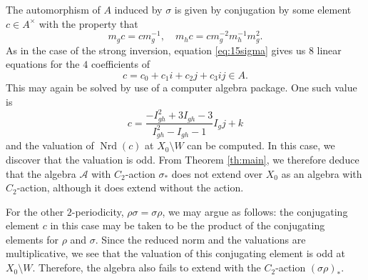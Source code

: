 \documentclass[reqno,oneside,dvipsnames,pdfnames,final]{amsart}
\theoremstyle{definition}
\newcommand{\sh}[1]{\mathcal{#1}}
\newcommand{\Nrd}{\operatorname{Nrd}}
\newcommand{\sm}{\setminus}
\begin{document}
The automorphism of $A$ induced by $\sigma$ is given by conjugation by some element $c \in A^\times$ with the property that
\begin{equation}
  m_g c = cm_g^{-1}, \quad m_h c = cm_g^{-2}m_h^{-1}m_g^2.\label{eq:15sigma}
\end{equation}
As in the case of the strong inversion, equation \eqref{eq:15sigma} gives us $8$ linear equations for the $4$ coefficients of
\[ c = c_0 + c_1 i + c_2 j + c_3 ij \in A.\]
This may again be solved by use of a computer algebra package. One such value is
\[ c= \frac{-I_{gh}^2 + 3 I_{gh} - 3}{I_{gh}^2 - I_{gh} - 1} I_g j + k \] and the valuation of $\Nrd(c)$ at $X_0\sm W$ can be computed. In this case, we discover that the valuation is odd. From Theorem \ref{th:main}, we therefore deduce that the algebra $\sh A$ with $C_2$-action $\sigma_*$ does not extend over $X_0$ as an algebra with $C_2$-action, although it does extend without the action.

For the other $2$-periodicity, $\rho\sigma=\sigma\rho$, we may argue as follows: the conjugating element $c$ in this case may be taken to be the product of the conjugating elements for $\rho$ and $\sigma$. Since the reduced norm and the valuations are multiplicative, we see that the valuation of this conjugating element is odd at $X_0 \sm W$. Therefore, the algebra also fails to extend with the $C_2$-action $(\sigma \rho)_\ast$.


\printbibliography
\end{document}

